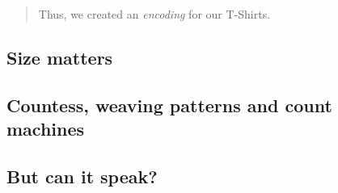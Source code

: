 \documentclass{article}
\begin{document}
            \begin{quote}
                Thus, we created an \emph{encoding} for our T-Shirts.
            \end{quote}

            \newpage
        \subsection{Size matters}

            \newpage
        \subsection{Countess, weaving patterns and count machines}

            \newpage
        \subsection{But can it speak?}
            \newpage


        

        

    
\end{document}
